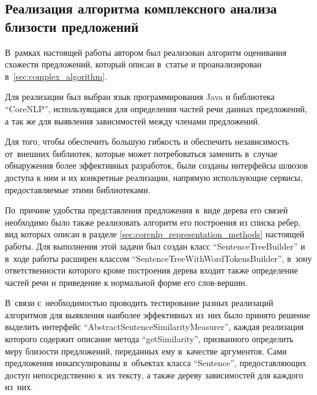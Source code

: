 \subsection{Реализация алгоритма комплексного анализа близости предложений}
В~рамках настоящей работы автором был реализован алгоритм оценивания
схожести предложений, который описан в~статье\cite{complexSim} и
проанализирован в~\ref{sec:complex_algorithm}.

Для реализации был выбран язык программирования Java и библиотека ``CoreNLP''\cite{corenlp},
используящаяся для определения частей речи данных предложений, а так же для выявления зависимостей
между членами предложений.

Для того, чтобы обеспечить большую гибкость и обеспечить независимость от~внешних библиотек,
которые может потребоваться заменить в~случае обнаружения более эффективных разработок,
были созданы интерфейсы шлюзов доступа к ним и их конкретные реализации, напрямую
использующие сервисы, предоставляемые этими библиотеками.

По~причине удобства представления предложения в~виде дерева его связей
необходимо было также реализовать алгоритм его построения из списка ребер, 
вид которых описан в разделе \ref{sec:corenlp_representation_methods} настоящей работы.
Для выполнения этой задачи был создан класс ``SentenceTreeBuilder'' и в~ходе работы расширен
классом ``SentenceTreeWithWordTokensBuilder'', в~зону ответственности которого
кроме построения дерева входит также определение частей речи и приведение к нормальной форме
его слов-вершин.



В~связи с~необходимостью проводить тестирование разных реализаций алгоритмов
для выявления наиболее эффективных из~них было принято решение выделить интерфейс
``AbstractSentenceSimilarityMeasurer'', каждая реализация которого содержит описание метода ``getSimilarity'',
призванного определить меру близости предложений, переданных ему в~качестве аргументов.
Сами предложения инкапсулированы в~объектах класса ``Sentence'', предоставляющих доступ
непосредственно к~их тексту, а также дереву зависимостей для каждого из~них.


